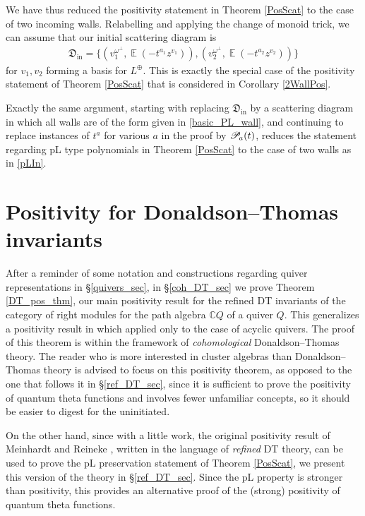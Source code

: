\documentclass{amsart}
\DeclareMathOperator{\pl}{\mathscr{P}\!}
\DeclareMathOperator{\In}{in}
\DeclareMathOperator{\EE}{\mathbb{E}}
\def\!{\mskip-\thinmuskip}
\let\f=\mathfrak
\theoremstyle{plain}%
\theoremstyle{definition}
\theoremstyle{remark}
\begin{document}
We have thus reduced the positivity statement in Theorem \ref{PosScat} to the case of two incoming walls.  Relabelling and applying the change of monoid trick, we can assume that our initial scattering diagram is
\begin{align}\label{two_wall_SD}
    \f{D}_{\In}=\{(v_1^{\omega^{\perp}},\EE(-t^{a_1}z^{v_1})),(v_2^{\omega^{\perp}},\EE(-t^{a_2}z^{v_2}))\}
\end{align}
for $v_1,v_2$ forming a basis for $L^{\oplus}$.  This is exactly the special case of the positivity statement of Theorem \ref{PosScat} that is considered in Corollary \ref{2WallPos}.



Exactly the same argument, starting with replacing $\f{D}_{\In}$ by a scattering diagram in which all walls are of the form given in \eqref{basic_PL_wall}, and continuing to replace instances of $t^a$ for various $a$ in the proof by $\pl_a(t)$, reduces the statement regarding pL type polynomials in Theorem \ref{PosScat} to the case of two walls as in \eqref{pLIn}.





\section{Positivity for Donaldson--Thomas invariants}
\label{pos_DT_sec}
After a reminder of some notation and constructions regarding quiver representations in \S\ref{quivers_sec}, in \S\ref{coh_DT_sec} we prove Theorem \ref{DT_pos_thm}, our main positivity result for the refined DT invariants of the category of right modules for the path algebra $\mathbb{C} Q$ of a quiver $Q$.  This generalizes a positivity result in \cite{MeiRei} which applied only to the case of acyclic quivers.  The proof of this theorem is within the framework of \textit{cohomological} Donaldson--Thomas theory.  The reader who is more interested in cluster algebras than Donaldson--Thomas theory is advised to focus on this positivity theorem, as opposed to the one that follows it in \S\ref{ref_DT_sec}, since it is sufficient to prove the positivity of quantum theta functions and involves fewer unfamiliar concepts, so it should be easier to digest for the uninitiated.

On the other hand, since with a little work, the original positivity result of Meinhardt and Reineke \cite{MeiRei}, written in the language of \textit{refined} DT theory, can be used to prove the pL preservation statement of Theorem \ref{PosScat}, we present this version of the theory in \S\ref{ref_DT_sec}.  Since the pL property is stronger than positivity, this provides an alternative proof of the (strong) positivity of quantum theta functions.
\end{document}
